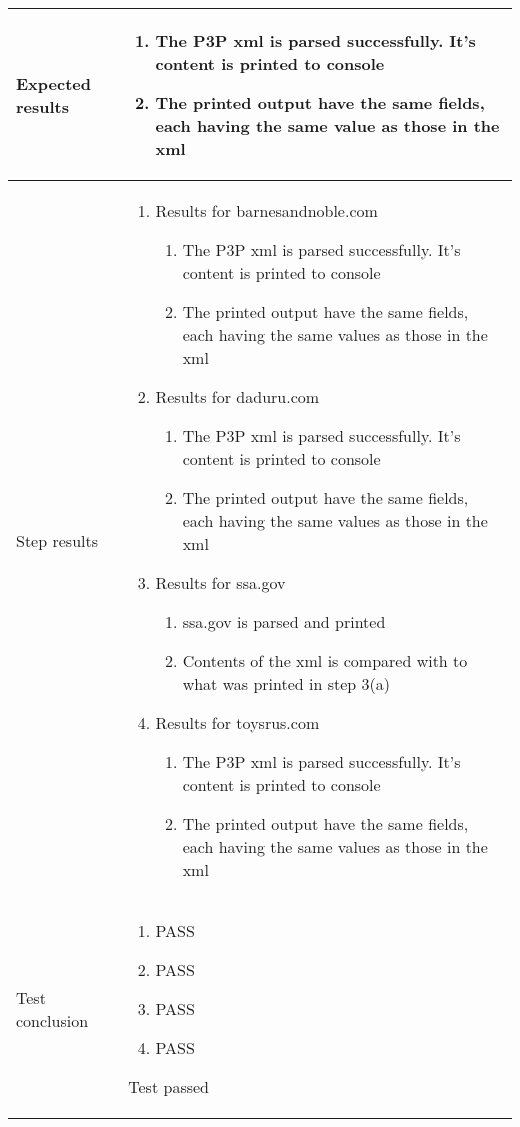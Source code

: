 \documentclass[a4paper]{article}
\begin{document}
\begin{center}
\begin{tabular}{ |  p{3cm} | p{7cm} | }
			Expected results &	\begin{enumerate}
							\item The P3P xml is parsed successfully. It's content is printed to console
							\item The printed output have the same fields, each having the same value as those in the xml
						\end{enumerate}
							 \\  [5pt] \hline

			Step results & 	\begin{enumerate}
							\item Results for barnesandnoble.com
							\begin{enumerate}
								\item The P3P xml is parsed successfully. It's content is printed to console
								\item The printed output have the same fields, each having the same values as those in the xml
							\end{enumerate}
							\item Results for daduru.com
							\begin{enumerate}
								\item The P3P xml is parsed successfully. It's content is printed to console
								\item The printed output have the same fields, each having the same values as those in the xml
							\end{enumerate}
							\item Results for ssa.gov
							\begin{enumerate}
								\item ssa.gov is parsed and printed
								\item Contents of the xml is compared with to what was printed in step 3(a)
							\end{enumerate}
							\item Results for toysrus.com
							\begin{enumerate}
								\item The P3P xml is parsed successfully. It's content is printed to console
								\item The printed output have the same fields, each having the same values as those in the xml
							\end{enumerate}
						\end{enumerate}
							 \\  [5pt] \hline

			Test conclusion & 	\begin{enumerate}
							\item PASS
							\item PASS
							\item PASS
							\item PASS
						\end{enumerate}
						Test passed \\  [5pt] \hline
		\end{tabular}
	\end{center}
\end{document}
